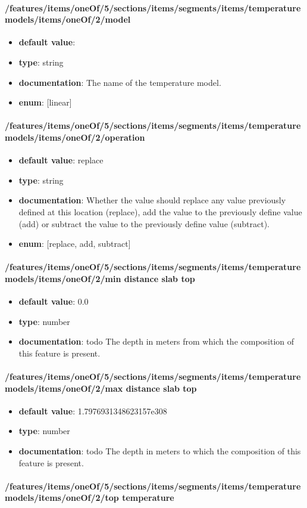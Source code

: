\paragraph{/features/items/oneOf/5/sections/items/segments/items/temperature models/items/oneOf/2/model}
\begin{itemize}\item {\bf default value}: 
\item {\bf type}: string
\item {\bf documentation}: The name of the temperature model.
\item {\bf enum}: [linear]\end{itemize}\paragraph{/features/items/oneOf/5/sections/items/segments/items/temperature models/items/oneOf/2/operation}
\begin{itemize}\item {\bf default value}: replace
\item {\bf type}: string
\item {\bf documentation}: Whether the value should replace any value previously defined at this location (replace), add the value to the previously define value (add) or subtract the value to the previously define value (subtract).
\item {\bf enum}: [replace, add, subtract]\end{itemize}\paragraph{/features/items/oneOf/5/sections/items/segments/items/temperature models/items/oneOf/2/min distance slab top}
\begin{itemize}\item {\bf default value}: 0.0
\item {\bf type}: number
\item {\bf documentation}: todo The depth in meters from which the composition of this feature is present.
\end{itemize}\paragraph{/features/items/oneOf/5/sections/items/segments/items/temperature models/items/oneOf/2/max distance slab top}
\begin{itemize}\item {\bf default value}: 1.7976931348623157e308
\item {\bf type}: number
\item {\bf documentation}: todo The depth in meters to which the composition of this feature is present.
\end{itemize}\paragraph{/features/items/oneOf/5/sections/items/segments/items/temperature models/items/oneOf/2/top temperature}
